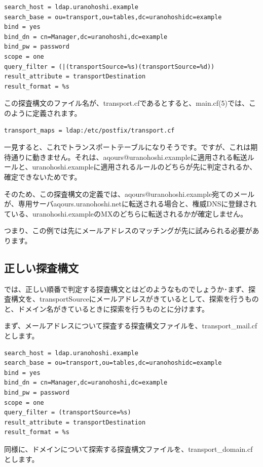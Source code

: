 \begin{verbatim}
search_host = ldap.uranohoshi.example
search_base = ou=transport,ou=tables,dc=uranohoshidc=example
bind = yes
bind_dn = cn=Manager,dc=uranohoshi,dc=example
bind_pw = password
scope = one
query_filter = (|(transportSource=%s)(transportSource=%d))
result_attribute = transportDestination
result_format = %s
\end{verbatim}

この探査構文のファイル名が、transport.cfであるとすると、main.cf(5)では、このように定義されます。

\begin{verbatim}
transport_maps = ldap:/etc/postfix/transport.cf
\end{verbatim}

一見すると、これでトランスポートテーブルになりそうです。ですが、これは期待通りに動きません。それは、aqours@uranohoshi.exampleに適用される転送ルールと、uranohoshi.exampleに適用されるルールのどちらが先に判定されるか、確定できないためです。

そのため、この探査構文の定義では、aqours@uranohoshi.example宛てのメールが、専用サーバaqours.uranohoshi.netに転送される場合と、権威DNSに登録されている、uranohoshi.exampleのMXのどちらに転送されるかが確定しません。

つまり、この例では先にメールアドレスのマッチングが先に試みられる必要があります。

\subsection{正しい探査構文}

では、正しい順番で判定する探査構文とはどのようなものでしょうか･まず、探査構文を、transportSourceにメールアドレスがきているとして、探索を行うものと、ドメイン名がきているときに探索を行うものとに分けます。

まず、メールアドレスについて探査する探査構文ファイルを、transport\_mail.cfとします。

\begin{verbatim}
search_host = ldap.uranohoshi.example
search_base = ou=transport,ou=tables,dc=uranohoshidc=example
bind = yes
bind_dn = cn=Manager,dc=uranohoshi,dc=example
bind_pw = password
scope = one
query_filter = (transportSource=%s)
result_attribute = transportDestination
result_format = %s
\end{verbatim}

同様に、ドメインについて探索する探査構文ファイルを、transport\_domain.cfとします。

